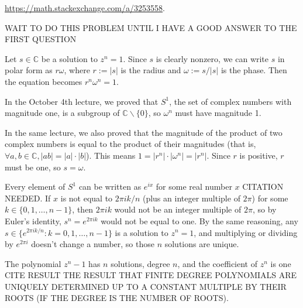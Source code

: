 \documentclass[12pt]{article}
\begin{document}
\url{https://math.stackexchange.com/a/3253558}.

\bigskip
\noindent{}\bigskip

WAIT TO DO THIS PROBLEM UNTIL I HAVE A GOOD ANSWER TO THE FIRST QUESTION

\noindent{}\bigskip

Let $s \in \mathbb{C}$ be a solution to $z^n=1$. Since $s$ is clearly nonzero, we can write $s$ in polar form as $r \omega$, where $r := |s|$ is the radius and $\omega := s/|s|$ is the phase. Then the equation becomes $r^n \omega^n = 1$.
\par
In the October 4th lecture, we proved that $S^1$, the set of complex numbers with magnitude one, is a subgroup of $\mathbb{C} \backslash \{0\}$, so $\omega^n$ must have magnitude 1.
\par
In the same lecture, we also proved that the magnitude of the product of two complex numbers is equal to the product of their magnitudes (that is, $\forall a,b \in \mathbb{C}, |ab|=|a|\cdot|b|$). This means $1 = |r^n|\cdot|\omega^n| = |r^n|$. Since $r$ is positive, $r$ must be one, so $s = \omega$.
\par
Every element of $S^1$ can be written as $e^{ix}$ for some real number $x$ CITATION NEEDED. If $x$ is not equal to $2 \pi i k / n$ (plus an integer multiple of $2 \pi$) for some $k \in \{0, 1, \dots, n-1\}$, then $2 \pi i k$ would not be an integer multiple of $2 \pi$, so by Euler's identity, $s^n = e^{2 \pi i k}$ would not be equal to one. By the same reasoning, any $s \in \{e^{2 \pi i k/n} : k = 0, 1, \dots, n-1\}$ is a solution to $z^n = 1$, and multiplying or dividing by $e^{2 \pi i}$ doesn't change a number, so those $n$ solutions are unique.
\par
The polynomial $z^n - 1$ has $n$ solutions, degree $n$, and the coefficient of $z^n$ is one
CITE RESULT THE RESULT THAT FINITE DEGREE POLYNOMIALS ARE UNIQUELY DETERMINED UP TO A CONSTANT MULTIPLE BY THEIR ROOTS (IF THE DEGREE IS THE NUMBER OF ROOTS).
\end{document}
